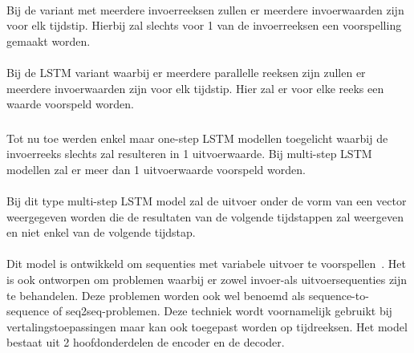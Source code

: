 \paragraph{}

Bij de variant met meerdere invoerreeksen zullen er meerdere invoerwaarden zijn voor elk tijdstip. Hierbij zal slechts voor 1 van de invoerreeksen een voorspelling gemaakt worden. 

\paragraph{}
Bij de LSTM variant waarbij er meerdere parallelle reeksen zijn zullen er meerdere invoerwaarden zijn voor elk tijdstip. Hier zal er voor elke reeks een waarde voorspeld worden.


\subsubsection{}

Tot nu toe werden enkel maar one-step LSTM modellen toegelicht waarbij de invoerreeks slechts zal resulteren in 1 uitvoerwaarde. Bij multi-step LSTM modellen zal er meer dan 1 uitvoerwaarde voorspeld worden.

\paragraph{}

Bij dit type multi-step LSTM model zal de uitvoer onder de vorm van een vector weergegeven worden die de resultaten van de volgende tijdstappen zal weergeven en niet enkel van de volgende tijdstap. 

\paragraph{}


Dit model is ontwikkeld om sequenties met variabele uitvoer te voorspellen~\autocite{Brownlee2017a}. Het is ook ontworpen om problemen waarbij er zowel invoer-als uitvoersequenties zijn te behandelen. Deze problemen worden ook wel benoemd als sequence-to-sequence of seq2seq-problemen. Deze techniek wordt voornamelijk gebruikt bij vertalingstoepassingen maar kan ook toegepast worden op tijdreeksen. 
Het model bestaat uit 2 hoofdonderdelen de encoder en de decoder. 


